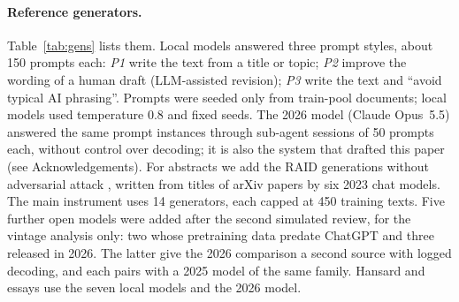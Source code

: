 \documentclass[11pt]{article}
\begin{document}
\paragraph{Reference generators.}
Table~\ref{tab:gens} lists them. Local models answered three prompt styles, about 150 prompts each:
\emph{P1} write the text from a title or topic; \emph{P2} improve the wording of a human draft (LLM-assisted
revision); \emph{P3} write the text and ``avoid typical AI phrasing''. Prompts were seeded only from train-pool
documents; local models used temperature 0.8 and fixed seeds. The 2026 model (Claude Opus~5.5) answered the same
prompt instances through sub-agent sessions of 50 prompts each, without control over decoding; it is also the
system that drafted this paper (see Acknowledgements). For abstracts we add the RAID generations without adversarial attack
\citep{dugan2024raid}, written from titles of arXiv papers by six 2023 chat models. The main instrument uses
14 generators, each capped at 450 training texts. Five further open models were added after the second simulated review, for the vintage analysis only: two whose pretraining data predate ChatGPT and three released in 2026. The latter give the 2026 comparison a second source with logged decoding, and each pairs with a 2025 model of the same family. Hansard and essays use the seven local models and the
2026 model.
\end{document}
